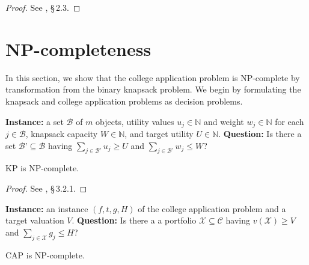 \begin{proof}
See \cite{kapur2022}, \S\,2.3. 
\end{proof}








\section{NP-completeness} \label{sectionNPC}

In this section, we show that the college application problem is NP-complete by transformation from the binary knapsack problem. We begin by formulating the knapsack and college application problems as decision problems. 

\begin{definition}
\textbf{Instance:} a set $\mathcal{B}$ of $m$ objects, utility values $u_j \in \mathbb{N}$ and weight $w_j \in \mathbb{N}$ for each $j \in \mathcal{B}$, knapsack capacity $W\in \mathbb{N}$, and target utility $U\in \mathbb{N}$. \textbf{Question:} Is there a set $\mathcal{B’} \subseteq \mathcal{B}$ having $\sum_{j \in \mathcal{B’}} u_j \geq U$ and  $\sum_{j \in \mathcal{B’}} w_j \leq W$?
\end{definition}

\begin{theorem} 
KP is NP-complete. 
\end{theorem}

\begin{proof}
See \cite{gareyjohnson1979}, \S\,3.2.1.
\end{proof}

\begin{definition} \label{ellisdecisionform}
\textbf{Instance:} an instance $(f, t, g, H)$ of the college application problem and a target valuation $V$. \textbf{Question:} Is there a a portfolio $\mathcal{X} \subseteq \mathcal{C}$ having $v(\mathcal{X}) \geq V$ and  $\sum_{j \in \mathcal{X}} g_j \leq H$?
\end{definition}

\begin{theorem}
CAP is NP-complete.
\end{theorem}

